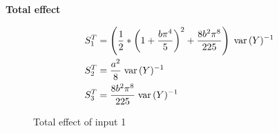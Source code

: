 \begin{frame}\textbf{Total effect}\vspace{0.3cm}

\begin{align*}
S^T_1 & = \left(\frac{1}{2} *  \left(1 +  \frac{b\pi^4}{5}\right)^2  +  \frac{8 b^2 \pi^8}{225}\right) \; \mathrm{var}\thinspace(Y)^{-1}\\
S^T_2 & = \frac{a^2}{8} \; \mathrm{var}\thinspace(Y)^{-1} \\
S^T_3 & =  \frac{8 b^2 \pi^8}{225} \; \mathrm{var}\thinspace(Y)^{-1}
\end{align*}


\end{frame}
\begin{frame}

\begin{figure}[h!]\centering
\caption{Total effect of input 1}


\end{figure}

\end{frame}
